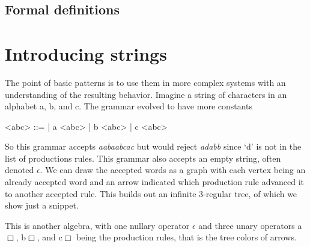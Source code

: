     
\subsection{Formal definitions}

\section{Introducing strings}
The point of basic patterns is to use them in more complex systems
with an understanding of the resulting behavior.  Imagine a string 
of characters in an alphabet a, b, and c.  The grammar evolved to 
have more constants 
\begin{center}
\begin{gcode}[]
<abc> ::=  
       | a <abc> 
       | b <abc>
       | c <abc> 
\end{gcode}
\end{center}
So this grammar accepts \emph{aabaabcac} 
but would reject \emph{adabb} since `d' is not in the list of productions 
rules.  This grammar also accepts an empty string, often denoted 
$\epsilon$.  We can draw the accepted words as a graph with each vertex 
being an already accepted word and an arrow indicated which production rule 
advanced it to another accepted rule.  This builds out an infinite 
3-regular tree, of which we show just a snippet.
\begin{center}
\end{center}
This is another algebra, with one nullary operator 
$\epsilon$ and three unary operators {\color{BrickRed}a$\Box$}, 
{\color{PineGreen}b$\Box$}, and {\color{RoyalBlue}c$\Box$}
being the production rules, that is the tree colors of arrows.

